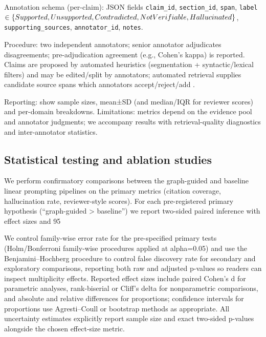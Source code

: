 \documentclass{article}%
\begin{document}
Annotation schema (per-claim): JSON fields \texttt{claim\_id}, \texttt{section\_id}, \texttt{span}, \texttt{label}$\in\{Supported,Unsupported,Contradicted,NotVerifiable,Hallucinated\\\}$, \texttt{supporting\_sources}, \texttt{annotator\_id}, \texttt{notes}.

Procedure: two independent annotators; senior annotator adjudicates disagreements; pre-adjudication agreement (e.g., Cohen's kappa) is reported. Claims are proposed by automated heuristics (segmentation + syntactic/lexical filters) and may be edited/split by annotators; automated retrieval supplies candidate source spans which annotators accept/reject/add \cite{web_yao_2023_readme_bridging_medical_jargon_and_lay_understan}.

Reporting: show sample sizes, mean±SD (and median/IQR for reviewer scores) and per-domain breakdowns. Limitations: metrics depend on the evidence pool and annotator judgments; we accompany results with retrieval-quality diagnostics and inter-annotator statistics.%

%
\subsection{Statistical testing and ablation studies}%


%
We perform confirmatory comparisons between the graph-guided and baseline linear prompting pipelines on the primary metrics (citation coverage, hallucination rate, reviewer-style scores). For each pre-registered primary hypothesis (“graph-guided > baseline”) we report two-sided paired inference with effect sizes and 95%

We control family-wise error rate for the pre-specified primary tests (Holm/Bonferroni family-wise procedures applied at alpha=0.05) and use the Benjamini–Hochberg procedure to control false discovery rate for secondary and exploratory comparisons, reporting both raw and adjusted p-values so readers can inspect multiplicity effects. Reported effect sizes include paired Cohen's d for parametric analyses, rank-biserial or Cliff's delta for nonparametric comparisons, and absolute and relative differences for proportions; confidence intervals for proportions use Agresti–Coull or bootstrap methods as appropriate. All uncertainty estimates explicitly report sample size and exact two-sided p-values alongside the chosen effect-size metric.
\end{document}

